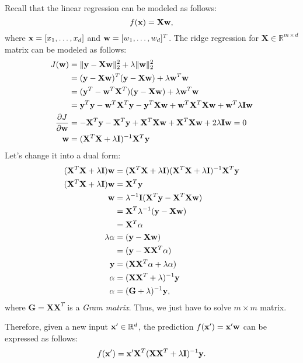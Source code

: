 Recall that the linear regression can be modeled as follows:
$$f({\mathbf{x}}) = \mathbf{X}{\mathbf{w}},$$
where ${\mathbf{x}} = [x_1, \dots, x_d]$ and ${\mathbf{w}} = [w_1,\dots,w_d]^T$. The ridge regression for $\mathbf{X}\in \mathbb{R}^{m\times d}$ matrix can be modeled as follows:
\begin{align}
	J({\mathbf{w}}) &= \|\mathbf{y}-\mathbf{X}{\mathbf{w}}\|^2_2 + \lambda \|{\mathbf{w}}\|^2_2 \\
			&= (\mathbf{y}-\mathbf{X}{\mathbf{w}})^T(\mathbf{y}-\mathbf{X}{\mathbf{w}})+\lambda{\mathbf{w}}^T{\mathbf{w}}\\
			&= (\mathbf{y}^T-{\mathbf{w}}^T\mathbf{X}^T)(\mathbf{y}-\mathbf{X}{\mathbf{w}})+\lambda{\mathbf{w}}^T{\mathbf{w}}\\
			&= {\mathbf{y}}^T{\mathbf{y}}-{\mathbf{w}}^T\mathbf{X}^T{\mathbf{y}}-{\mathbf{y}}^T\mathbf{X}{\mathbf{w}}+{\mathbf{w}}^T\mathbf{X}^T\mathbf{X}{\mathbf{w}}+{\mathbf{w}}^T\lambda\mathbf{I}{\mathbf{w}}\\
	\frac{\partial J}{\partial {\mathbf{w}}}&= -\mathbf{X}^T{\mathbf{y}}-\mathbf{X}^T{\mathbf{y}}+\mathbf{X}^T\mathbf{X}{\mathbf{w}}+\mathbf{X}^T\mathbf{X}{\mathbf{w}}+2\lambda\mathbf{I}{\mathbf{w}} = 0\\
	{\mathbf{w}}	&= (\mathbf{X}^T\mathbf{X}+\lambda\mathbf{I})^{-1}\mathbf{X}^T{\mathbf{y}}
	\label{eq:ridge_regression}
\end{align}
Let's change it into a dual form:
\begin{align}
	(\mathbf{X}^T\mathbf{X}+\lambda\mathbf{I}){\mathbf{w}}	&= (\mathbf{X}^T\mathbf{X}+\lambda\mathbf{I})(\mathbf{X}^T\mathbf{X}+\lambda\mathbf{I})^{-1}\mathbf{X}^T{\mathbf{y}}\\
	(\mathbf{X}^T\mathbf{X}+\lambda\mathbf{I}){\mathbf{w}} &= \mathbf{X}^T{\mathbf{y}}\\ 
	{\mathbf{w}} &= \lambda^{-1}\mathbf{I}(\mathbf{X}^T{\mathbf{y}}-\mathbf{X}^T\mathbf{X}{\mathbf{w}})\\
	&= \mathbf{X}^T\lambda^{-1}({\mathbf{y}}-\mathbf{X}{\mathbf{w}})\\
	&= \mathbf{X}^T\alpha\\
	\lambda\alpha &= ({\mathbf{y}}-\mathbf{X}{\mathbf{w}})\\
	&= ({\mathbf{y}}-\mathbf{X}\mathbf{X}^T\alpha)\\
	{\mathbf{y}} &= (\mathbf{X}\mathbf{X}^T\alpha+\lambda\alpha)\\
	\alpha &= (\mathbf{X}\mathbf{X}^T+\lambda)^{-1}{\mathbf{y}}\\
	\alpha &= (\mathbf{G}+\lambda)^{-1}{\mathbf{y}},
	\label{eq:dual_regression}
\end{align}
where $\mathbf{G} = \mathbf{X}\mathbf{X}^T$ is a \textit{Gram matrix}. Thus, we just have to solve $m\times m$ matrix. 

Therefore, given a new input ${\mathbf{x}}'\in \mathbb{R}^d$, the prediction $f({\mathbf{x}}') = {\mathbf{x}}'{\mathbf{w}} $ can be expressed as follows:
$$f({\mathbf{x}}') = {\mathbf{x}}'\mathbf{X}^T(\mathbf{X}\mathbf{X}^T+\lambda\mathbf{I})^{-1}{\mathbf{y}}.$$


